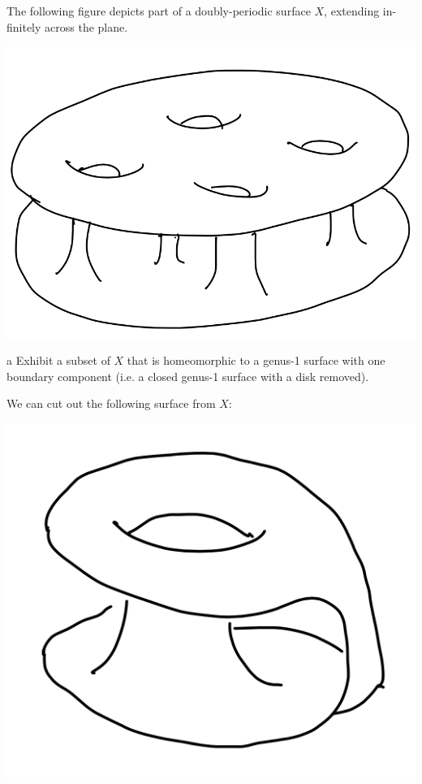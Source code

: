 \documentclass{lkx_pset}
\begin{document}
\begin{problem}{2}
  The following figure depicts part of a doubly-periodic surface $X$, extending in-
  finitely across the plane.
\end{problem}

\begin{solution}
  \begin{center}
    \includegraphics[scale=0.5]{figure1.png}
  \end{center}
  \begin{part}{a}
    Exhibit a subset of $X$ that is homeomorphic to a genus-1 surface with one boundary component (i.e. a closed genus-1 surface with a disk removed).
  \end{part}

  We can cut out the following surface from $X$:
  \begin{center}
    \includegraphics[scale=0.5]{figure2.png}
  \end{center}


\end{solution}
\end{document}

